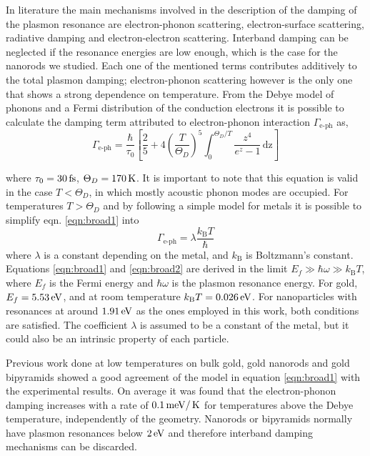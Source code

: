 In literature the main mechanisms involved in the description of the damping of
the plasmon resonance are electron-phonon scattering, electron-surface
scattering, radiative damping and electron-electron
scattering\cite{Sonnichsen2002,Novo2006,Hu2008}.
Interband damping can be neglected if the resonance energies are low enough,
which is the case for the nanorods we studied. Each one of the mentioned terms
contributes additively to the total plasmon damping; electron-phonon scattering
however is the only one that shows a strong dependence on
temperature\cite{Liu2009b,Konrad2013}.
From the Debye model of phonons and a Fermi distribution of the conduction
electrons it is possible to calculate the damping term attributed to
electron-phonon interaction $\Gamma_{\textrm{e-ph}}$ as\cite{McKay1976},
\begin{equation}\label{eqn:broad1}
\Gamma_{\textrm{e-ph}} = 
\frac{\hbar}{\tau_0} \left[ \frac{2}{5}+4 \left( \frac{T}{\Theta_D} \right)^5
\int_0^{\Theta_D/T} \frac{z^4}{e^z - 1}\,\textrm{dz} \right]
\end{equation}

where $\tau_0 = 30\,\textrm{fs}$\cite{Liu2009b}, $\Theta_D = 170\,\textrm{K}$\cite{Link1999b}.  It
is important to note that this equation is valid in the case $T<\Theta_D$, in
which mostly acoustic phonon modes are occupied. For temperatures $T>\Theta_D$
and by following a simple model for metals it is possible to simplify eqn.
\ref{eqn:broad1} into\cite{Kittel1996}
\begin{equation}\label{eqn:broad2}
\Gamma_{\textrm{e-ph}} = \lambda\frac{k_\textrm{B}T}{\hbar}
\end{equation}
where $\lambda$ is a constant depending on the metal, and $k_\textrm{B}$ is
Boltzmann's constant. Equations \ref{eqn:broad1} and \ref{eqn:broad2} are
derived in the limit $E_f \gg \hbar\omega \gg k_\textrm{B}T$, where $E_f$ is the
Fermi energy and $\hbar\omega$ is the plasmon resonance energy. For gold, $E_f
= 5.53\,\textrm{eV}$, and at room temperature $k_\textrm{B}T=0.026\,\textrm{eV}$. For nanoparticles with resonances at around $1.91\,\textrm{eV}$ as the ones employed in this work, both
conditions are satisfied. The coefficient $\lambda$ is assumed to be a constant
of the metal, but it could also be an intrinsic property of each particle.

Previous work done at low temperatures on bulk gold\cite{McKay1976}, gold
nanorods\cite{Konrad2013} and gold bipyramids\cite{Liu2009b} showed a good
agreement of the model in equation \ref{eqn:broad1} with the experimental
results. On average it was found that the electron-phonon damping increases with
a rate of $0.1\,\textrm{meV}/\,\textrm{K}$ for temperatures above the Debye temperature,
independently of the geometry. Nanorods or bipyramids normally have plasmon
resonances below $2\,\textrm{eV}$ and therefore interband damping mechanisms can be
discarded.
\cite{Sundararaman2014,AlejandroManjavacasJunG.LiuVikramKulkarni2014}

